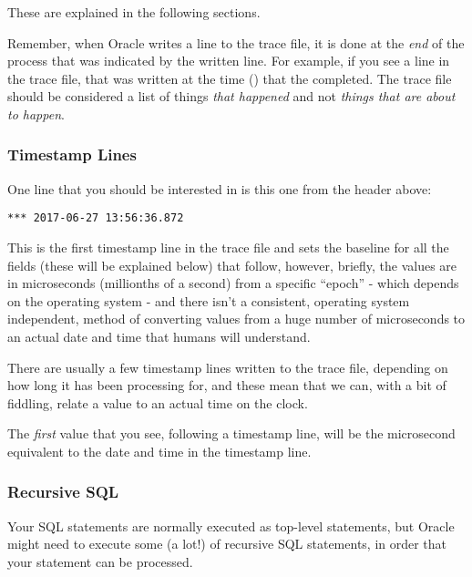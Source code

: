 These are explained in the following sections.

\begin{note}
Remember, when Oracle writes a line to the trace file, it is done at the \emph{end} of the process that was indicated by the written line. For example, if you see a  line in the trace file, that was written at the time () that the  completed. The trace file should be considered a list of things \emph{that happened} and not \emph{things that are about to happen}.
\end{note}


\subsubsection{Timestamp Lines}\label{timestamp-lines}

One line that you should be interested in is this one from the header above:

\begin{lstlisting}[numbers=none,caption={Time Stamp Line}]
*** 2017-06-27 13:56:36.872
\end{lstlisting}

This is the first timestamp line in the trace file and sets the baseline for all the  fields (these will be explained below) that follow, however, briefly, the  values are in microseconds (millionths of a second) from a specific ``epoch'' - which depends on the operating system - and there isn't a consistent, operating system independent, method of converting  values from a huge number of microseconds to an actual date and time that humans will understand.

There are usually a few timestamp lines written to the trace file, depending on how long it has been processing for, and these mean that we can, with a bit of fiddling, relate a  value to an actual time on the clock.

The \emph{first}  value that you see, following a timestamp line, will be the microsecond equivalent to the date and time in the timestamp line.

\subsubsection{Recursive SQL}\label{recursive-sql}

Your SQL statements are normally executed as top-level statements, but Oracle might need to execute some (a lot!) of recursive SQL statements, in order that your statement can be processed. 

